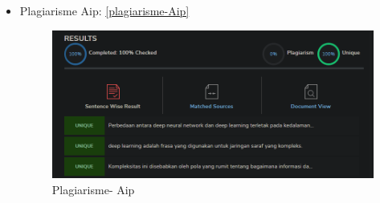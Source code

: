 \begin{itemize}
\item  Plagiarisme Aip: \ref{plagiarisme-Aip}
\par
\begin{figure}[!hbtp]
\centering
\includegraphics[scale=0.3]{figures/AIP/plagiat.PNG}
\caption{Plagiarisme- Aip}
\label{chapter-7-plagiarisme-Aip}
\end{figure}
\par
\par
\end{itemize}


\par
\par
